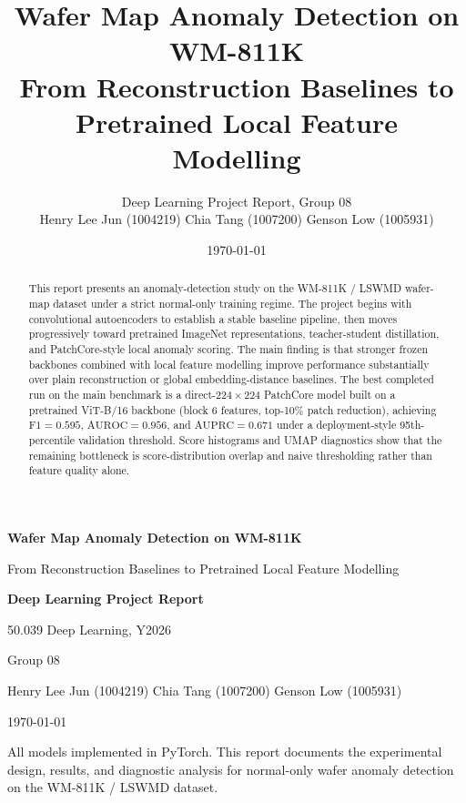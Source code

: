 \documentclass[11pt]{article}
\title{%
  \textbf{Wafer Map Anomaly Detection on WM-811K}\\[0.4em]
  \large From Reconstruction Baselines to Pretrained Local Feature Modelling
}
\author{Deep Learning Project Report, Group 08\\[0.3em]
  Henry Lee Jun (1004219) \quad Chia Tang (1007200) \quad Genson Low (1005931)}
\date{\today}
\begin{document}
\begin{titlepage}
  \centering
  \vspace*{2cm}
  {\LARGE\bfseries Wafer Map Anomaly Detection on WM-811K\par}
  \vspace{0.5cm}
  {\large From Reconstruction Baselines to Pretrained Local Feature Modelling\par}
  \vspace{1.5cm}
  {\large\bfseries Deep Learning Project Report\par}
  \vspace{0.4cm}
  {\large 50.039 Deep Learning, Y2026\par}
  \vspace{0.4cm}
  {\large Group 08\par}
  \vspace{0.6cm}
  {\normalsize
    Henry Lee Jun (1004219) \quad
    Chia Tang (1007200) \quad
    Genson Low (1005931)\par}
  \vspace{0.8cm}

  {\large \today\par}
  \vfill
  {\small All models implemented in PyTorch. This report documents the experimental design,
  results, and diagnostic analysis for normal-only wafer anomaly detection on the
  WM-811K / LSWMD dataset.\par}
\end{titlepage}


\begin{abstract}
This report presents an anomaly-detection study on the WM-811K / LSWMD wafer-map dataset
under a strict normal-only training regime. The project begins with convolutional autoencoders
to establish a stable baseline pipeline, then moves progressively toward pretrained
ImageNet representations, teacher-student distillation, and PatchCore-style local anomaly
scoring. The main finding is that stronger frozen backbones combined with local feature
modelling improve performance substantially over plain reconstruction or global
embedding-distance baselines. The best completed run on the main benchmark is a
direct-$224\!\times\!224$ PatchCore model built on a pretrained ViT-B/16 backbone
(block 6 features, top-10\% patch reduction), achieving $\mathrm{F1}=0.595$,
$\mathrm{AUROC}=0.956$, and $\mathrm{AUPRC}=0.671$ under a deployment-style
95th-percentile validation threshold.
Score histograms and UMAP diagnostics show that the remaining bottleneck is
score-distribution overlap and naive thresholding rather than feature quality alone.
\end{abstract}
\end{document}
